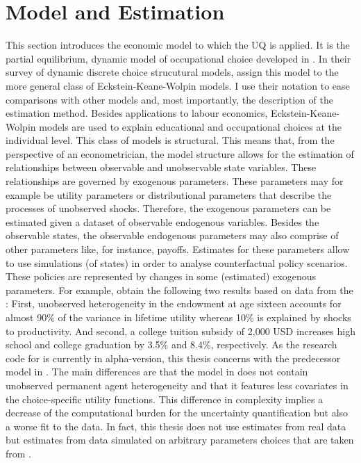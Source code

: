 \newpage %

\section{Model and Estimation}
\thispagestyle{plain} %
This section introduces the economic model to which the UQ is applied. It is the partial equilibrium, dynamic model of occupational choice developed in \cite{Keane.1994}. In their survey of dynamic discrete choice strucutural models, \cite{Aguirregabiria.2010} assign this model to the more general class of Eckstein-Keane-Wolpin models. I use their notation to ease comparisons with other models and, most importantly, the description of the estimation method. Besides applications to labour economics, Eckstein-Keane-Wolpin models are used to explain educational and occupational choices at the individual level. This class of models is structural. This means that, from the perspective of an econometrician, the model structure allows for the estimation of relationships between observable and unobservable state variables. These relationships are governed by exogenous parameters. These parameters may for example be utility parameters or distributional parameters that describe the processes of unobserved shocks. Therefore, the exogenous parameters can be estimated given a dataset of observable endogenous variables. Besides the observable states, the observable endogenous parameters may also comprise of other parameters like, for instance, payoffs. Estimates for these parameters allow to use simulations (of states) in order to analyse counterfactual policy scenarios. These policies are represented by changes in some (estimated) exogenous parameters. For example, \cite{Keane.1997} obtain the following two results based on data from the : First, unobserved heterogeneity in the endowment at age sixteen accounts for almost 90\% of the variance in lifetime utility whereas 10\% is explained by shocks to productivity. And second, a college tuition subsidy of 2,000 USD increases high school and college graduation by 3.5\% and 8.4\%, respectively. As the research code for \cite{Keane.1997} is currently in alpha-version, this thesis concerns with the predecessor model in \cite{Keane.1994}. The main differences are that the model in \cite{Keane.1994} does not contain unobserved permanent agent heterogeneity and that it features less covariates in the choice-specific utility functions. This difference in complexity implies a decrease of the computational burden for the uncertainty quantification but also a worse fit to the data. In fact, this thesis does not use estimates from real data but estimates from data simulated on arbitrary parameters choices that are taken from \cite{Keane.1994}.

